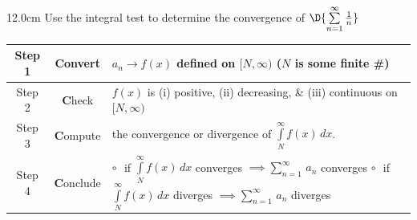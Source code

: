 \begin{frame}
\frametitle{}
\scriptsize
\begin{columns}
\begin{column}{12.0cm}
	Use the integral test to determine the convergence of \quad $\D{\sum \limits_{n=1}^{\infty} \frac{1}{n}}$
	
\vspace{0.2cm}

\begin{tabular}{| c | c | p{7.6cm} |}
		\hline
		Step 1 & {\bf C}onvert & $a_n \to f(x)$ defined on $[N,\infty)$ \quad ($N$ is some finite \#) \\
		\hline
	 	Step 2 & {\bf C}heck & $f(x)$ is (i) positive, (ii) decreasing, \& (iii) continuous on $[N,\infty)$\\
		\hline
		Step 3 & {\bf C}ompute & the convergence or divergence of $\int \limits_{N}^{\infty} f(x) \, dx$.\\
		\hline
		Step 4 & {\bf C}onclude & $\circ$\,\, if $\int \limits_{N}^{\infty} f(x) \, dx$ converges $\implies \sum \limits_{n=1}^{\infty}\, a_n$ converges \newline $\circ$\,\, if $\int \limits_{N}^{\infty} f(x) \, dx$ diverges $\implies \sum \limits_{n=1}^{\infty}\, a_n$ diverges  \\
		\hline
	\end{tabular}

\vspace{0.2cm}


\end{column}
\end{columns}
\end{frame}
